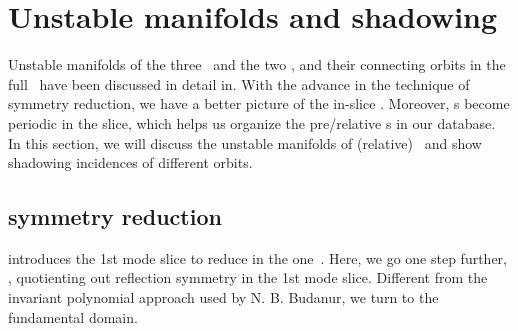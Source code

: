 \section{Unstable manifolds and shadowing}
\label{sect:shadow}

Unstable manifolds of the three \eqva\ and the two \reqva,
and their connecting orbits in the full
\statesp\ have been discussed in detail in.
With the advance in the technique of
symmetry reduction, we have a better picture of the in-slice \statesp.
Moreover, \rpo s become periodic in the slice, which helps us
organize the pre/relative \po s in our database.
In this section, we will discuss the unstable manifolds of
(relative) \eqva\ and show shadowing incidences of different orbits.

\subsection{ symmetry reduction}
\label{sect:ksO2}

 introduces the 1st mode slice to reduce 
in the one\dmn\ \KSe. Here, we go one step further, \ie, quotienting
out reflection symmetry in the 1st mode slice.
Different from the invariant polynomial approach used by
N. B. Budanur, we turn to the fundamental
domain.

